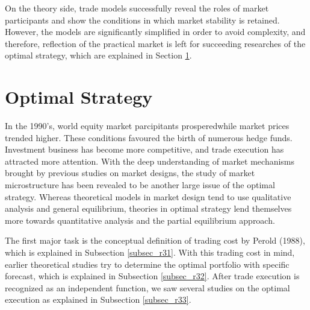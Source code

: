 On the theory side, trade models successfully reveal the roles of market participants and show the conditions in which market stability is retained.  However, the models are significantly simplified in order to avoid complexity, and therefore, reflection of the practical market is left for succeeding researches of the optimal strategy, which are explained in Section \ref{sec_r3}.

\section{Optimal Strategy}\label{sec_r3}
In the 1990's, world equity market parcipitants prosperedwhile market prices trended higher.  These conditions favoured the birth of numerous hedge funds.  Investment business has become more competitive, and trade execution has attracted more attention.  With the deep understanding of market mechanisms brought by previous studies on market designs, the study of market microstructure has been revealed to be another large issue of the optimal strategy.
Whereas theoretical models in market design tend to use qualitative analysis and general equilibrium, theories in optimal strategy lend themselves more towards quantitative analysis and the partial equilibrium approach.

The first major task is the conceptual definition of trading cost by
Perold (1988), which is explained in Subsection \ref{subsec_r31}.  With this trading cost in mind, earlier theoretical studies try to determine the optimal portfolio with specific forecast, which is explained in Subsection \ref{subsec_r32}.  After trade execution is recognized as an independent function, we saw several studies on the optimal execution as explained in Subsection \ref{subsec_r33}.

